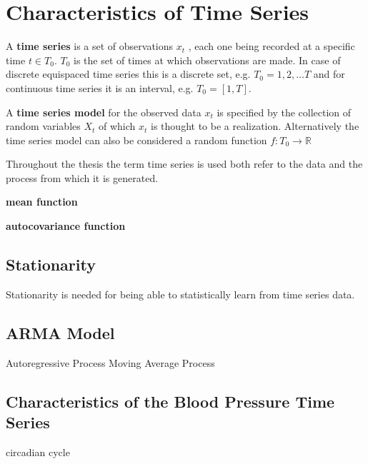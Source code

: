

\chapter{Characteristics of Time Series}

A \textbf{time series} is a set of observations $x_t$ , each one being recorded at a specific time $t \in T_0$.
$T_0$ is the set of times at which observations are made.
In case of discrete equispaced time series this is a discrete set, e.g. $T_0 = {1, 2, \dots T}$
and for continuous time series it is an interval, e.g. $T_0 = [1, T]$.

A \textbf{time series model} for the observed data ${x_t}$ is specified by the collection of random variables
${X_t}$ of which ${x_t}$ is thought to be a realization.
Alternatively the time series model can also be considered a random function $f: T_0 \to \mathbb{R}$

Throughout the thesis the term time series is used both refer to the data and the process from which it is generated.


\textbf{mean function}

\textbf{autocovariance function}


\section{Stationarity}
Stationarity is needed for being able to statistically learn from time series data.



\section{ARMA Model}

Autoregressive Process
Moving Average Process



\section{Characteristics of the Blood Pressure Time Series}

circadian cycle






